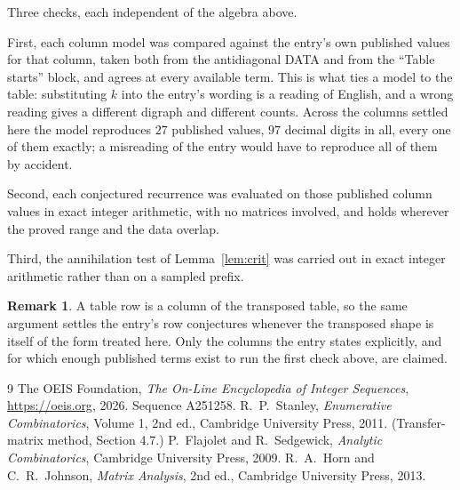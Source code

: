 \documentclass[11pt,a4paper]{article}
\theoremstyle{plain}
\theoremstyle{definition}
\newtheorem{remark}[theorem]{Remark}
\begin{document}
Three checks, each independent of the algebra above.

First, each column model was compared against the entry's own published values for that
column, taken both from the antidiagonal DATA and from the ``Table starts'' block, and agrees
at every available term. This is what ties a model to the table: substituting $k$ into the
entry's wording is a reading of English, and a wrong reading gives a different digraph and
different counts. Across the columns settled here the model reproduces $27$ published
values, $97$ decimal digits in all, every one of them exactly; a misreading of the entry
would have to reproduce all of them by accident.

Second, each conjectured recurrence was evaluated on those published column values in exact
integer arithmetic, with no matrices involved, and holds wherever the proved range and the
data overlap.

Third, the annihilation test of Lemma~\ref{lem:crit} was carried out in exact integer
arithmetic rather than on a sampled prefix.

\begin{remark}
A table row is a column of the transposed table, so the same argument settles the entry's row
conjectures whenever the transposed shape is itself of the form treated here. Only the columns
the entry states explicitly, and for which enough published terms exist to run the first check
above, are claimed.
\end{remark}

\begin{thebibliography}{9}
 The OEIS Foundation, \emph{The On-Line Encyclopedia of Integer
Sequences}, \url{https://oeis.org}, 2026. Sequence A251258.
 R.~P.~Stanley, \emph{Enumerative Combinatorics}, Volume 1, 2nd ed.,
Cambridge University Press, 2011. (Transfer-matrix method, Section 4.7.)
 P.~Flajolet and R.~Sedgewick, \emph{Analytic Combinatorics}, Cambridge
University Press, 2009.
 R.~A.~Horn and C.~R.~Johnson, \emph{Matrix Analysis}, 2nd ed., Cambridge
University Press, 2013.
\end{thebibliography}
\end{document}

